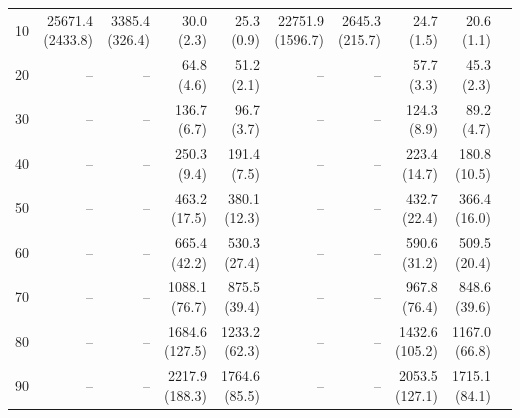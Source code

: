 \begin{table}[htp]
{\begin{tabular}{|r|r|r|r|r|r|r|r|r|r|}
    10 & 25671.4 (2433.8) & 3385.4 (326.4) & 30.0 (2.3)     & 25.3 (0.9)     & 22751.9 (1596.7) & 2645.3 (215.7) & 24.7 (1.5)     & 20.6 (1.1)  \\
    20 & --               & --             & 64.8 (4.6)     & 51.2 (2.1)     &  --              &  --            & 57.7 (3.3)     & 45.3 (2.3)  \\
    30 & --               & --             & 136.7 (6.7)    & 96.7 (3.7)     &  --              &  --            & 124.3 (8.9)    & 89.2 (4.7)  \\
    40 & --               & --             & 250.3 (9.4)    & 191.4 (7.5)    &  --              &  --            & 223.4 (14.7)   & 180.8 (10.5) \\
    50 & --               & --             & 463.2 (17.5)   & 380.1 (12.3)   &  --              &  --            & 432.7 (22.4)   & 366.4 (16.0) \\
    60 & --               & --             & 665.4 (42.2)   & 530.3 (27.4)   &  --              &  --            & 590.6 (31.2)   & 509.5 (20.4) \\
    70 & --               & --             & 1088.1 (76.7)  & 875.5 (39.4)   &  --              &  --            & 967.8 (76.4)   & 848.6 (39.6) \\
    80 & --               & --             & 1684.6 (127.5) & 1233.2 (62.3)  &  --              &  --            & 1432.6 (105.2) & 1167.0 (66.8) \\
    90 & --               & --             & 2217.9 (188.3) & 1764.6 (85.5)  &  --              &  --            & 2053.5 (127.1) & 1715.1 (84.1) \\
                                                                                                                                  

\end{tabular}}
\end{table}
